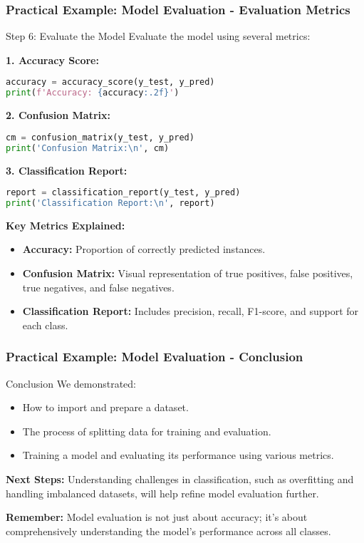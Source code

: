 \documentclass[aspectratio=169]{beamer}
\begin{document}
\begin{frame}[fragile]
    \frametitle{Practical Example: Model Evaluation - Evaluation Metrics}
    \begin{block}{Step 6: Evaluate the Model}
        Evaluate the model using several metrics:
        
        \textbf{1. Accuracy Score:}
        \begin{lstlisting}[language=Python]
accuracy = accuracy_score(y_test, y_pred)
print(f'Accuracy: {accuracy:.2f}')
        \end{lstlisting}
        
        \textbf{2. Confusion Matrix:}
        \begin{lstlisting}[language=Python]
cm = confusion_matrix(y_test, y_pred)
print('Confusion Matrix:\n', cm)
        \end{lstlisting}
        
        \textbf{3. Classification Report:}
        \begin{lstlisting}[language=Python]
report = classification_report(y_test, y_pred)
print('Classification Report:\n', report)
        \end{lstlisting}
        
        \textbf{Key Metrics Explained:}
        \begin{itemize}
            \item \textbf{Accuracy:} Proportion of correctly predicted instances.
            \item \textbf{Confusion Matrix:} Visual representation of true positives, false positives, true negatives, and false negatives.
            \item \textbf{Classification Report:} Includes precision, recall, F1-score, and support for each class.
        \end{itemize}
    \end{block}
\end{frame}

\begin{frame}[fragile]
    \frametitle{Practical Example: Model Evaluation - Conclusion}
    \begin{block}{Conclusion}
        We demonstrated:
        \begin{itemize}
            \item How to import and prepare a dataset.
            \item The process of splitting data for training and evaluation.
            \item Training a model and evaluating its performance using various metrics.
        \end{itemize}
    \end{block}
    
    \textbf{Next Steps:} Understanding challenges in classification, such as overfitting and handling imbalanced datasets, will help refine model evaluation further.

    \textbf{Remember:} Model evaluation is not just about accuracy; it's about comprehensively understanding the model's performance across all classes.
\end{frame}
\end{document}
